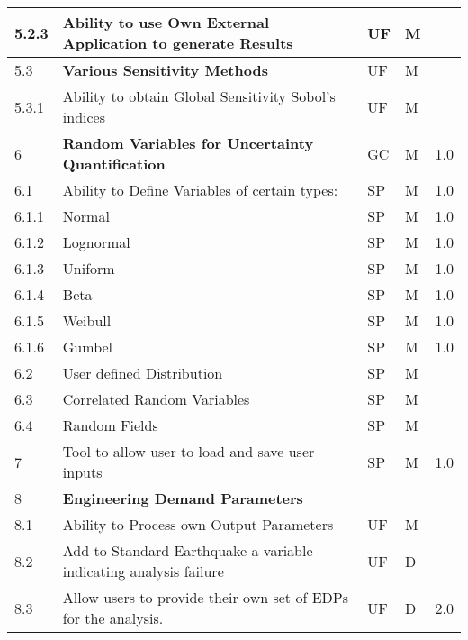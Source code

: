 \begin{longtable}{| p{} | p{} | p{} | p{} |  p{} |}
  5.2.3 & Ability to use Own External Application to generate Results & UF & M &  \\ \hline
  5.3 & \textbf{Various Sensitivity Methods} & UF & M &  \\ \hline
  5.3.1 & Ability to obtain Global Sensitivity Sobol's indices & UF & M &  \\ \hline
    6 & \textbf{Random Variables for Uncertainty Quantification} & GC & M & 1.0  \\ \hline
    6.1 & Ability to Define Variables of certain types: & SP & M & 1.0  \\ 
    6.1.1 & Normal & SP & M  & 1.0 \\ \hline
    6.1.2 & Lognormal & SP & M & 1.0 \\ \hline
    6.1.3 & Uniform & SP & M & 1.0  \\ \hline
    6.1.4 & Beta & SP & M & 1.0 \\ \hline
    6.1.5 & Weibull &  SP & M  & 1.0 \\ \hline
    6.1.6 & Gumbel &  SP & M & 1.0  \\ \hline
    6.2 & User defined Distribution & SP & M &  \\ \hline
    6.3 & Correlated Random Variables & SP & M &  \\ \hline
    6.4 & Random Fields & SP & M &  \\ \hline
     7 & Tool to allow user to load and save user inputs & SP & M & 1.0 \\ \hline
    8 & \textbf{Engineering Demand Parameters} &  &  \\ \hline
    8.1 & Ability to Process own Output Parameters & UF & M &   \\ \hline
    8.2 & Add to Standard Earthquake a variable indicating analysis failure & UF & D &   \\ \hline
    8.3 & Allow users to provide their own set of EDPs for the analysis. & UF & D & 2.0\\ \hline


\end{longtable}
